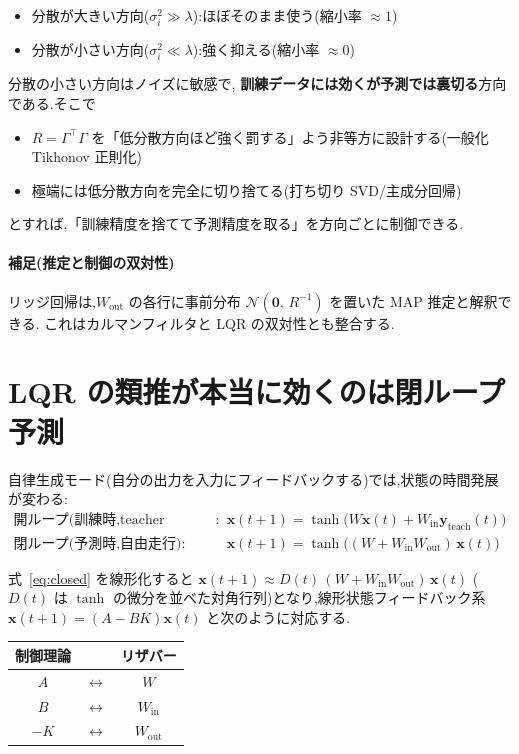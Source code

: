 \documentclass[a4paper,11pt]{ltjsarticle}
\newcommand{\Win}{W_{\mathrm{in}}}
\newcommand{\Wout}{W_{\mathrm{out}}}
\newcommand{\yt}{\bm{y}_{\mathrm{teach}}}
\newcommand{\T}{^{\top}}
\begin{document}
\begin{itemize}
  \item 分散が大きい方向($\sigma_i^2 \gg \lambda$):ほぼそのまま使う(縮小率 $\approx 1$)
  \item 分散が小さい方向($\sigma_i^2 \ll \lambda$):強く抑える(縮小率 $\approx 0$)
\end{itemize}

分散の小さい方向はノイズに敏感で,
\textbf{訓練データには効くが予測では裏切る}方向である.そこで
\begin{itemize}
  \item $R = \Gamma\T\Gamma$ を「低分散方向ほど強く罰する」よう非等方に設計する(一般化 Tikhonov 正則化)
  \item 極端には低分散方向を完全に切り捨てる(打ち切り SVD/主成分回帰)
\end{itemize}
とすれば,「訓練精度を捨てて予測精度を取る」を方向ごとに制御できる.

\paragraph{補足(推定と制御の双対性)}
リッジ回帰は,$\Wout$ の各行に事前分布 $\mathcal{N}(\bm{0},\,R^{-1})$ を置いた MAP 推定と解釈できる.
これはカルマンフィルタと LQR の双対性とも整合する.

\section{LQR の類推が本当に効くのは閉ループ予測}

自律生成モード(自分の出力を入力にフィードバックする)では,状態の時間発展が変わる:
\begin{align}
  \text{開ループ(訓練時,teacher forcing)}:\quad
  & \bm{x}(t+1) = \tanh\!\bigl(W\bm{x}(t) + \Win\yt(t)\bigr) \\
  \text{閉ループ(予測時,自由走行)}:\quad
  & \bm{x}(t+1) = \tanh\!\bigl((W + \Win\Wout)\,\bm{x}(t)\bigr)
  \label{eq:closed}
\end{align}

式~\eqref{eq:closed} を線形化すると $\bm{x}(t+1) \approx D(t)\,(W + \Win \Wout)\,\bm{x}(t)$
($D(t)$ は $\tanh$ の微分を並べた対角行列)となり,線形状態フィードバック系
$\bm{x}(t+1) = (A - BK)\bm{x}(t)$ と次のように対応する.

\begin{center}
\begin{tabular}{ccc}
\toprule
制御理論 & & リザバー \\
\midrule
$A$ & $\leftrightarrow$ & $W$ \\
$B$ & $\leftrightarrow$ & $\Win$ \\
$-K$ & $\leftrightarrow$ & $\Wout$ \\
\bottomrule
\end{tabular}
\end{center}
\end{document}
